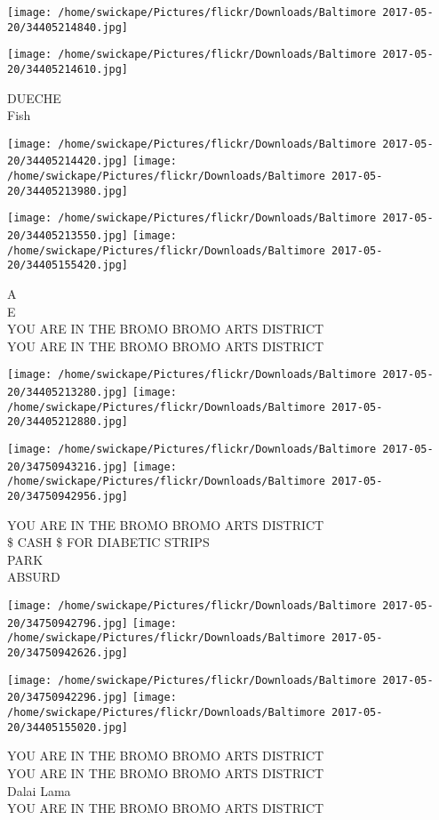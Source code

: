 \documentclass[10pt,letterpaper]{article}
\begin{document}
\texttt{[image: /home/swickape/Pictures/flickr/Downloads/Baltimore 2017-05-20/34405214840.jpg]}

\vspace{0.25in}
\texttt{[image: /home/swickape/Pictures/flickr/Downloads/Baltimore 2017-05-20/34405214610.jpg]}

DUECHE\\
Fish
\pagebreak

\texttt{[image: /home/swickape/Pictures/flickr/Downloads/Baltimore 2017-05-20/34405214420.jpg]}
\texttt{[image: /home/swickape/Pictures/flickr/Downloads/Baltimore 2017-05-20/34405213980.jpg]}

\texttt{[image: /home/swickape/Pictures/flickr/Downloads/Baltimore 2017-05-20/34405213550.jpg]}
\texttt{[image: /home/swickape/Pictures/flickr/Downloads/Baltimore 2017-05-20/34405155420.jpg]}

A\\
E\\
YOU ARE IN THE BROMO BROMO ARTS DISTRICT\\
YOU ARE IN THE BROMO BROMO ARTS DISTRICT
\pagebreak

\texttt{[image: /home/swickape/Pictures/flickr/Downloads/Baltimore 2017-05-20/34405213280.jpg]}
\texttt{[image: /home/swickape/Pictures/flickr/Downloads/Baltimore 2017-05-20/34405212880.jpg]}

\texttt{[image: /home/swickape/Pictures/flickr/Downloads/Baltimore 2017-05-20/34750943216.jpg]}
\texttt{[image: /home/swickape/Pictures/flickr/Downloads/Baltimore 2017-05-20/34750942956.jpg]}

YOU ARE IN THE BROMO BROMO ARTS DISTRICT\\
\$ CASH \$ FOR DIABETIC STRIPS\\
PARK\\
ABSURD
\pagebreak

\texttt{[image: /home/swickape/Pictures/flickr/Downloads/Baltimore 2017-05-20/34750942796.jpg]}
\texttt{[image: /home/swickape/Pictures/flickr/Downloads/Baltimore 2017-05-20/34750942626.jpg]}

\texttt{[image: /home/swickape/Pictures/flickr/Downloads/Baltimore 2017-05-20/34750942296.jpg]}
\texttt{[image: /home/swickape/Pictures/flickr/Downloads/Baltimore 2017-05-20/34405155020.jpg]}

YOU ARE IN THE BROMO BROMO ARTS DISTRICT\\
YOU ARE IN THE BROMO BROMO ARTS DISTRICT\\
Dalai Lama\\
YOU ARE IN THE BROMO BROMO ARTS DISTRICT
\pagebreak
\end{document}

